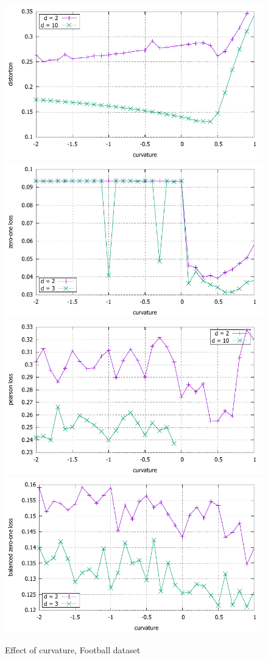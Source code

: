 \documentclass{article} %
\begin{document}
\begin{figure}
    \centering
    \includegraphics[width = 0.49 \textwidth]{football_distortion.pdf}
    \includegraphics[width = 0.49 \textwidth]{football_zero_one.pdf}
    \includegraphics[width = 0.49 \textwidth]{football_pearson.pdf}
    \includegraphics[width = 0.49 \textwidth]{football_balanced_zero_one.pdf}
    \caption{Effect of curvature, Football dataset}
    \label{fig:football}
\end{figure}
\end{document}
